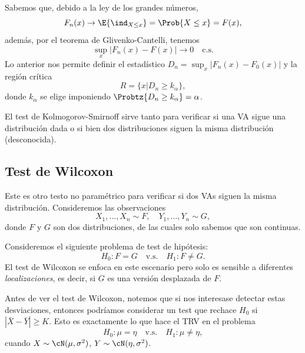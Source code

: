 Sabemos que, debido a la ley de los grandes números, 
\begin{equation}
	F_n(x)\to \E{\ind_{X\leq x}} = \Prob{X\leq x} =  F(x),
\end{equation}
además, por el teorema de Glivenko-Cantelli, tenemos 
\begin{equation}
	\sup_x|F_n(x)-F(x)| \to 0 \quad\text{c.s.}
\end{equation}
Lo anterior nos permite definir el estadístico  $D_n = \sup_x|F_n(x)-F_0(x)|$ y la región crítica
\begin{equation}
	R = \{x|D_n\geq k_\alpha\},
\end{equation}
donde $k_\alpha$ se elige imponiendo $\Probtz{D_n\geq  k_\alpha}=\alpha$.

\begin{remark}
El test de  Kolmogorov-Smirnoff sirve tanto para verificar si una VA sigue una distribución dada o si bien dos distribuciones siguen la misma distribución (desconocida).
\end{remark}

\subsection{Test de Wilcoxon} 
\label{sub:test_Wilc}

Este es otro testo no paramétrico para verificar si dos VAs siguen la misma distribución. Consideremos las observaciones 
\begin{equation}
	X_1,\ldots,X_n\sim F,\quad Y_1,\ldots,Y_n\sim G,
\end{equation}
donde $F$ y $G$ son dos distribuciones, de las cuales solo sabemos que son continuas. 

Consideremos el siguiente problema de test de hipótesis: 
	\begin{equation}
		H_0:F=G\quad \text{v.s.}\quad H_1:F\neq G.
	\end{equation}
El test de Wilcoxon se enfoca en este escenario pero solo es sensible a diferentes \emph{localizaciones}, es decir, si $G$ es una versión desplazada de $F$.

Antes de ver el test de Wilcoxon, notemos que si nos interesase detectar estas desviaciones, entonces podríamos considerar un test que rechace $H_0$ si $|\bar{X} - \bar{Y}|\geq K$. Esto  es exactamente lo que hace el TRV en el problema 
	\begin{equation}
		H_0:\mu =  \eta \quad \text{v.s.}\quad H_1:\mu\neq \eta,
	\end{equation}
cuando $X\sim\cN(\mu,\sigma^2)$,  $Y\sim\cN(\eta,\sigma^2)$.


